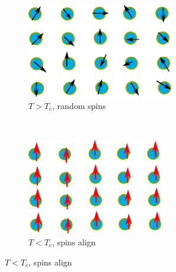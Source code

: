 \documentclass[notheorems]{beamer}
\begin{document}
\begin{frame}
\begin{columns}
	\end{columns}
\begin{figure}
	\centering
	\begin{subfigure}{0.4\textwidth}
		\includegraphics[width=0.7\textwidth]{Tlarge.pdf}
		\caption{$T>T_c$, random spins}
	\end{subfigure}~
	\begin{subfigure}{0.4\textwidth}
		\includegraphics[width=0.65\textwidth]{Tsmall.pdf}
		\caption{$T<T_c$, spins align}
	\end{subfigure}
\end{figure}
\end{frame}
\end{document}
